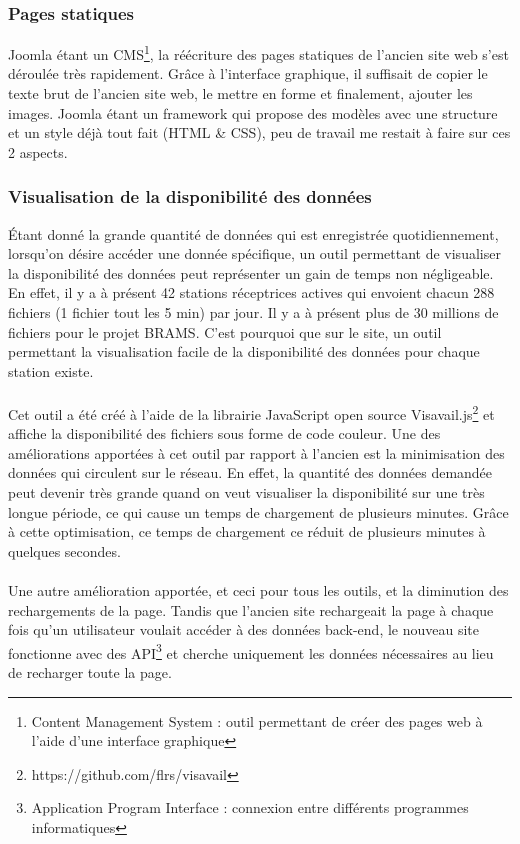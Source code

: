 \documentclass[11pt]{article}
\begin{document}
\subsubsection{Pages statiques}
Joomla étant un CMS\footnote{Content Management System : outil permettant de créer des pages web à l'aide d'une interface graphique}, la réécriture des pages statiques de l'ancien site web s'est déroulée très rapidement.
Grâce à l'interface graphique, il suffisait de copier le texte brut de l'ancien site web, le mettre en forme et finalement, ajouter les images.
Joomla étant un framework qui propose des modèles avec une structure et un style déjà tout fait (HTML \& CSS), peu de travail me restait à faire sur ces 2 aspects.

\subsubsection{Visualisation de la disponibilité des données}
Étant donné la grande quantité de données qui est enregistrée quotidiennement, lorsqu'on désire accéder une donnée spécifique, un outil permettant de visualiser la disponibilité des données peut représenter un gain de temps non négligeable.
En effet, il y a à présent 42 stations réceptrices actives qui envoient chacun 288 fichiers (1 fichier tout les 5 min) par jour.
Il y a à présent plus de 30 millions de fichiers pour le projet BRAMS.
C'est pourquoi que sur le site, un outil permettant la visualisation facile de la disponibilité des données pour chaque station existe.\\
\\
Cet outil a été créé à l'aide de la librairie JavaScript open source Visavail.js\footnote{https://github.com/flrs/visavail} et affiche la disponibilité des fichiers sous forme de code couleur.
Une des améliorations apportées à cet outil par rapport à l'ancien est la minimisation des données qui circulent sur le réseau.
En effet, la quantité des données demandée peut devenir très grande quand on veut visualiser la disponibilité sur une très longue période, ce qui cause un temps de chargement de plusieurs minutes.
Grâce à cette optimisation, ce temps de chargement ce réduit de plusieurs minutes à quelques secondes.\\
\\
Une autre amélioration apportée, et ceci pour tous les outils, et la diminution des rechargements de la page.
Tandis que l'ancien site rechargeait la page à chaque fois qu'un utilisateur voulait accéder à des données back-end, le nouveau site fonctionne avec des API\footnote{Application Program Interface : connexion entre différents programmes informatiques} et cherche uniquement les données nécessaires au lieu de recharger toute la page.
\end{document}
